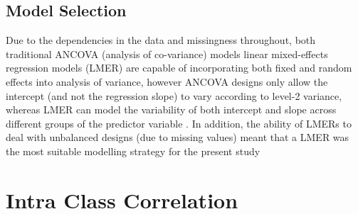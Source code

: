 {\newpage
{} %
\begin{landscape}






\clearpage




\clearpage




\end{landscape}
\restoregeometry











\subsection{\label{app5:modelSelection}Model Selection}
Due to the dependencies in the data and missingness throughout, both traditional ANCOVA (analysis of co-variance) models linear mixed-effects regression models (LMER) are capable of incorporating both fixed and random effects into analysis of variance, however ANCOVA designs only allow the intercept (and not the regression slope) to vary according to level-2 variance, whereas LMER can model the variability of both intercept and slope across different groups of the predictor variable \citep{Field2012}. In addition, the ability of LMERs to deal with unbalanced designs (due to missing values) meant that a LMER was the most suitable modelling strategy for the present study



\section{Intra Class Correlation}

}
